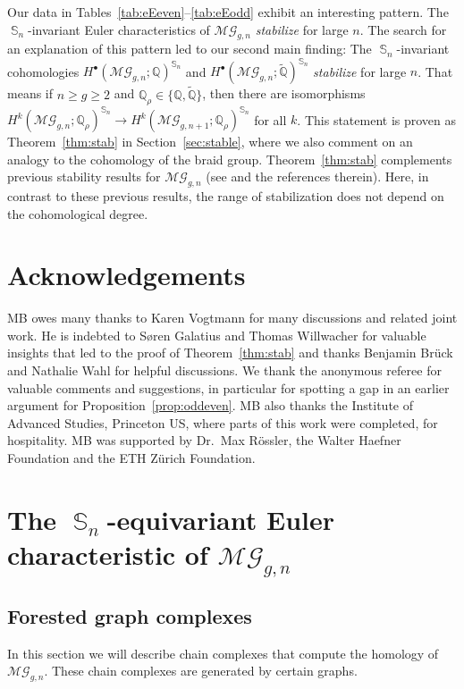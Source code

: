 \documentclass[oneside]{amsart}
\theoremstyle{remark}
\newcommand{\Q}{\mathbb{Q}}
\newcommand{\tQ}{\widetilde{\Q}}
\DeclareMathOperator{\SG}{{\mathbb S}}
\newcommand{\MG}{\mathcal{MG}}
\begin{document}
Our data in Tables~\ref{tab:eEeven}--\ref{tab:eEodd} exhibit an interesting pattern. The $\SG_n$-invariant Euler characteristics of $\MG_{g,n}$ \emph{stabilize} for large $n$.
The search for an explanation of this pattern led to our second main finding: The $\SG_n$-invariant cohomologies $H^\bullet(\MG_{g,n};\Q)^{\SG_n}$ and  $H^\bullet(\MG_{g,n};\tQ)^{\SG_n}$ \emph{stabilize} for large $n$. That means if  $n \geq g \geq 2$ and $\Q_\rho \in \{\Q,\tQ\}$, then there are  isomorphisms $H^k(\MG_{g,n};\Q_\rho)^{\SG_n}\rightarrow H^k(\MG_{g,n+1};\Q_\rho)^{\SG_n}$ for all $k$.
 This statement is proven as Theorem~\ref{thm:stab} in Section~\ref{sec:stable}, where we also comment on an analogy to the cohomology of the braid group. 
%
Theorem~\ref{thm:stab} complements previous stability results for $\MG_{g,n}$ (see \cite{conant2016assembling} and the references therein). 
Here, in contrast to these previous results, the range of stabilization does not depend on the cohomological degree. 
%
%
%

%

%
%

%

%
%
%
%
%
%
%
%
%

%

%
%
%
%

\section*{Acknowledgements}
MB owes many thanks to Karen Vogtmann for many discussions and related joint work.  He is indebted to S{\o}ren Galatius and Thomas Willwacher
for valuable insights that led to the proof of Theorem~\ref{thm:stab} and thanks Benjamin Br\"uck and Nathalie Wahl for helpful discussions.
We thank the anonymous referee for valuable comments and suggestions, in particular for spotting a gap in an earlier argument for Proposition~\ref{prop:oddeven}.
MB also thanks the Institute of Advanced Studies, Princeton US, where parts of this work were completed, for hospitality.
  MB was supported by Dr.\ Max Rössler, the Walter Haefner Foundation and the ETH Zürich Foundation.  %

\section{The \texorpdfstring{$\SG_n$}{Sn}-equivariant Euler characteristic of \texorpdfstring{$\MG_{g,n}$}{MGgn}}
\label{sec:SGequivariant}
\subsection{Forested graph complexes}
\label{sec:forest}
In this section we will describe chain complexes that compute the homology of $\MG_{g,n}$. These chain complexes are generated by certain graphs.
\end{document}
